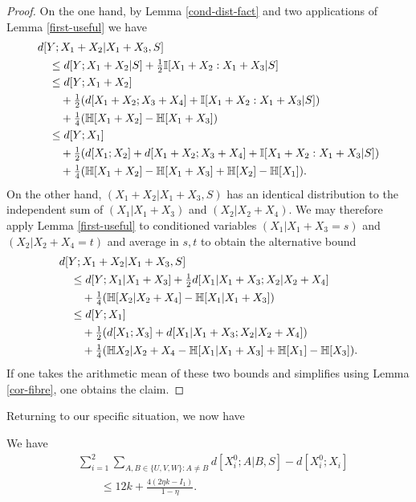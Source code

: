 \begin{proof}
  On the one hand, by Lemma \ref{cond-dist-fact} and two applications of Lemma \ref{first-useful} we have
  \begin{align*}
  &d[Y;X_1+X_2|X_1 + X_3, S] \\
  &\quad \leq d[Y;X_1+X_2|S] + \tfrac{1}{2} \mathbb{I}[X_1 + X_2 : X_1 + X_3|S] \\
  &\quad \leq d[Y;X_1+X_2]\\
  &\qquad + \tfrac{1}{2} (d[X_1+X_2;X_3+X_4] + \mathbb{I}[X_1 + X_2 : X_1 + X_3|S])\\
  &\qquad + \tfrac{1}{4} (\mathbb{H}[X_1+X_2] - \mathbb{H}[X_1+X_3])\\
  &\quad \leq d[Y;X_1] \\
  &\qquad + \tfrac{1}{2} (d[X_1;X_2] + d[X_1+X_2;X_3+X_4] + \mathbb{I}[X_1 + X_2 : X_1 + X_3|S])\\
  &\qquad + \tfrac{1}{4} (\mathbb{H}[X_1+X_2] - \mathbb{H}[X_1+X_3] + \mathbb{H}[X_2] - \mathbb{H}[X_1]).
  \end{align*}
On the other hand, $(X_1+X_2|X_1 + X_3, S)$ has an identical distribution to the independent sum of $(X_1|X_1+X_3)$ and $(X_2|X_2+X_4)$.  We may therefore apply Lemma \ref{first-useful} to conditioned variables $(X_1|X_1+X_3=s)$ and $(X_2|X_2+X_4=t)$ and average in $s,t$ to
  obtain the alternative bound
  \begin{align*}
  &  d[Y;X_1+X_2|X_1 + X_3, S] \\
  &\quad \leq d[Y;X_1|X_1+X_3] + \tfrac{1}{2} d[X_1|X_1+X_3; X_2|X_2+X_4] \\
  &\qquad + \tfrac{1}{4} (\mathbb{H}[X_2|X_2+X_4] - \mathbb{H}[X_1|X_1+X_3]) \\
  &\quad  \leq d[Y;X_1] \\
  &\qquad + \tfrac{1}{2} (d[X_1;X_3] + d[X_1|X_1+X_3;X_2|X_2+X_4])\\
  &\qquad + \tfrac{1}{4} (\mathbb{H}{X_2|X_2+X_4} - \mathbb{H}[X_1|X_1+X_3] + \mathbb{H}[X_1] - \mathbb{H}[X_3]).
  \end{align*}
  If one takes the arithmetic mean of these two bounds and simplifies using Lemma \ref{cor-fibre}, one obtains the claim.
\end{proof}

Returning to our specific situation, we now have

\begin{lemma}\label{dist-diff-bound}\label{dist_diff_bound} We have
\begin{align*}  &\sum_{i=1}^2 \sum_{A,B \in \{U,V,W\}: A \neq B}  d[X_i^0;A|B, S] - d[X_i^0;X_i]\\
&\qquad \leq 12 k + \frac{4(2 \eta k - I_1)}{1-\eta}.
\end{align*}
\end{lemma}

